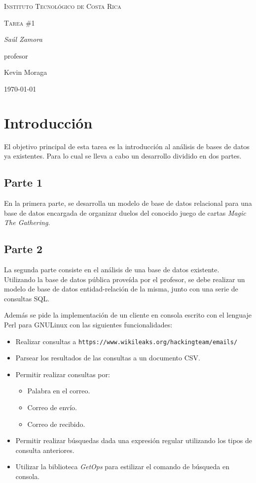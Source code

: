 \documentclass{article}
\begin{document}
\begin{titlepage}
  \centering
  {\scshape\LARGE Instituto Tecnol\'ogico de Costa Rica \par}
  \vspace{1cm}
  {\scshape\Large Tarea \#1\par}
  \vspace{1.5cm}
  {\Large\itshape Sa\'ul Zamora\par}
  \vfill
  profesor\par
  Kevin Moraga \textsc{}

  \vfill

  {\large \today\par}
\end{titlepage}

\section{Introducci\'on}
El objetivo principal de esta tarea es la introducci\'on al an\'alisis de bases de datos ya existentes. Para lo cual se lleva a cabo un desarrollo dividido en dos partes.

\subsection{Parte 1}
En la primera parte, se desarrolla un modelo de base de datos relacional para una base de datos encargada de organizar duelos del conocido juego de cartas \emph{Magic The Gathering}.

\subsection{Parte 2}
La segunda parte consiste en el an\'alisis de una base de datos existente. Utilizando la base de datos p\'ublica prove\'ida por el profesor, se debe realizar un modelo de base de datos entidad-relaci\'on de la misma, junto con una serie de consultas SQL.

Adem\'as se pide la implementaci\'on de un cliente en consola escrito con el lenguaje Perl para GNU\/Linux con las siguientes funcionalidades:
\begin{itemize}
  \item Realizar consultas a \texttt{https://www.wikileaks.org/hackingteam/emails/}
  \item Parsear los resultados de las consultas a un documento CSV.
  \item Permitir realizar consultas por:
  \begin{itemize}
    \item Palabra en el correo.
    \item Correo de env\'io.
    \item Correo de recibido.
  \end{itemize}
  \item Permitir realizar b\'usquedas dada una expresi\'on regular utilizando los tipos de consulta anteriores.
  \item Utilizar la biblioteca \emph{GetOps} para estilizar el comando de b\'usqueda en consola.
\end{itemize}
\end{document}
